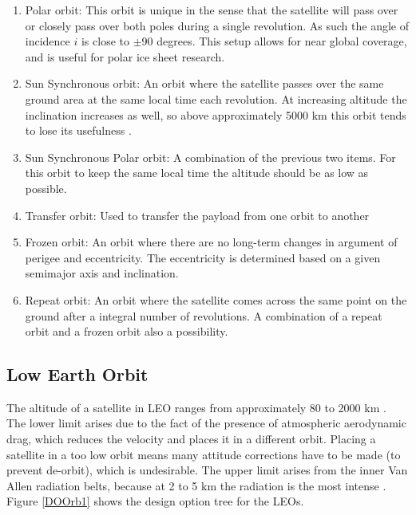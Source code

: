 \begin{enumerate}
	\item Polar orbit:
	This orbit is unique in the sense that the satellite will pass over or closely pass over both poles during a single revolution. As such the angle of incidence $i$ is close to  $\pm$90 degrees. This setup allows for near global coverage, and is useful for polar ice sheet research.
	\item Sun Synchronous orbit:
	An orbit where the satellite passes over the same ground area at the same local time each revolution. At increasing altitude the inclination increases as well, so above approximately 5000 km this orbit tends to lose its usefulness \cite{larson}. 
	\item Sun Synchronous Polar orbit:
	A combination of the previous two items. For this orbit to keep the same local time the altitude should be as low as possible.
	\item Transfer orbit:
	Used to transfer the payload from one orbit to another
	\item Frozen orbit:
	An orbit where there are no long-term changes in argument of perigee and eccentricity. The eccentricity is determined based on a given semimajor axis and inclination.
	\item Repeat orbit:
	An orbit where the satellite comes across the same point on the ground after a integral number of revolutions. A combination of a repeat orbit and a frozen orbit also a possibility.
\end{enumerate}

\subsection{Low Earth Orbit}
\label{sec:blOrb1}
The altitude of a satellite in \acs{LEO} ranges from approximately 80 to 2000 km \cite{nasaOrbit}. The lower limit arises due to the fact of the presence of atmospheric aerodynamic drag, which reduces the velocity and places it in a different orbit. Placing a satellite in a too low orbit means many attitude corrections have to be made (to prevent de-orbit), which is undesirable. The upper limit arises from the inner Van Allen radiation belts, because at 2 to 5 km the radiation is the most intense \cite{sse}. Figure \ref{DOOrb1} shows the design option tree for the \ac{LEO}s.


